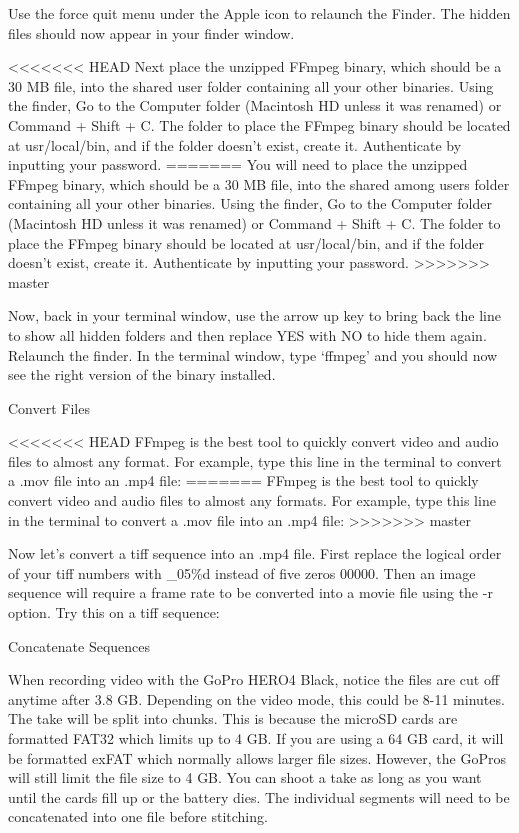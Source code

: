 \begin{fullwidth}
Use the force quit menu under the Apple icon to relaunch the Finder. The hidden files should now appear in your finder window. 

<<<<<<< HEAD
Next place the unzipped FFmpeg binary, which should be a 30 MB file, into the shared user folder containing all your other binaries. Using the finder, Go to the Computer folder (Macintosh HD unless it was renamed) or Command + Shift + C. The folder to place the FFmpeg binary should be located at usr/local/bin, and if the folder doesn’t exist, create it. Authenticate by inputting your password. 
=======
You will need to place the unzipped FFmpeg binary, which should be a 30 MB file, into the shared among users folder containing all your other binaries. Using the finder, Go to the Computer folder (Macintosh HD unless it was renamed) or Command + Shift + C. The folder to place the FFmpeg binary should be located at usr/local/bin, and if the folder doesn’t exist, create it. Authenticate by inputting your password. 
>>>>>>> master

Now, back in your terminal window, use the arrow up key to bring back the line to show all hidden folders and then replace YES with NO to hide them again. Relaunch the finder. In the terminal window, type ‘ffmpeg’ and you should now see the right version of the binary installed.

{\large Convert Files \par}

<<<<<<< HEAD
FFmpeg is the best tool to quickly convert video and audio files to almost any format. For example, type this line in the terminal to convert a .mov file into an .mp4 file:
=======
FFmpeg is the best tool to quickly convert video and audio files to almost any formats. For example, type this line in the terminal to convert a .mov file into an .mp4 file:
>>>>>>> master


Now let’s convert a tiff sequence into an .mp4 file. First replace the logical order of your tiff numbers with \_05\%d instead of five zeros 00000. Then an image sequence will require a frame rate to be converted into a movie file using the -r option. Try this on a tiff sequence:


{\large Concatenate Sequences \par}

When recording video with the GoPro HERO4 Black, notice the files are cut off anytime after 3.8 GB. Depending on the video mode, this could be 8-11 minutes. The take will be split into chunks. This is because the microSD cards are formatted FAT32 which limits up to 4 GB. If you are using a 64 GB card, it will be formatted exFAT which normally allows larger file sizes. However, the GoPros will still limit the file size to 4 GB. You can shoot a take as long as you want until the cards fill up or the battery dies. The individual segments will need to be concatenated into one file before stitching.


\end{fullwidth}

